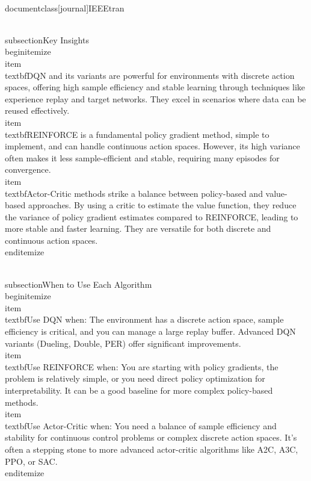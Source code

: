 \\documentclass[journal]{IEEEtran}
\begin{document}
\\subsection{Key Insights}
\\begin{itemize}
    \\item \\textbf{DQN and its variants} are powerful for environments with discrete action spaces, offering high sample efficiency and stable learning through techniques like experience replay and target networks. They excel in scenarios where data can be reused effectively.
    \\item \\textbf{REINFORCE} is a fundamental policy gradient method, simple to implement, and can handle continuous action spaces. However, its high variance often makes it less sample-efficient and stable, requiring many episodes for convergence.
    \\item \\textbf{Actor-Critic methods} strike a balance between policy-based and value-based approaches. By using a critic to estimate the value function, they reduce the variance of policy gradient estimates compared to REINFORCE, leading to more stable and faster learning. They are versatile for both discrete and continuous action spaces.
\\end{itemize}

\\subsection{When to Use Each Algorithm}
\\begin{itemize}
    \\item \\textbf{Use DQN when}: The environment has a discrete action space, sample efficiency is critical, and you can manage a large replay buffer. Advanced DQN variants (Dueling, Double, PER) offer significant improvements.
    \\item \\textbf{Use REINFORCE when}: You are starting with policy gradients, the problem is relatively simple, or you need direct policy optimization for interpretability. It can be a good baseline for more complex policy-based methods.
    \\item \\textbf{Use Actor-Critic when}: You need a balance of sample efficiency and stability for continuous control problems or complex discrete action spaces. It's often a stepping stone to more advanced actor-critic algorithms like A2C, A3C, PPO, or SAC.
\\end{itemize}
\end{document}
